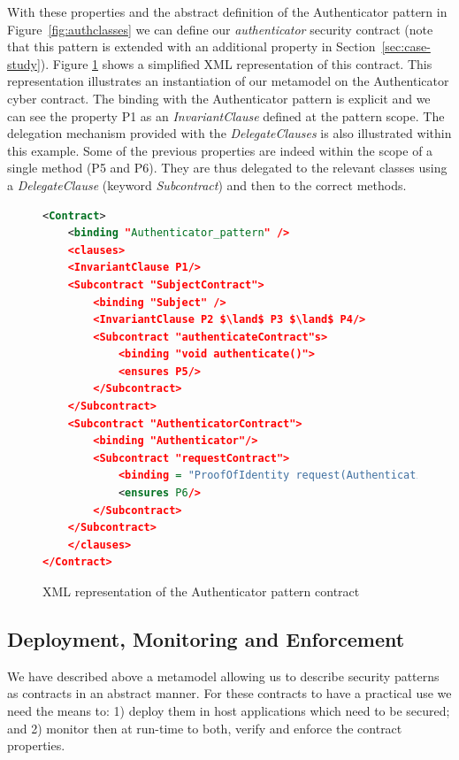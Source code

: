 With these properties and the abstract definition of the Authenticator pattern in Figure~\ref{fig:authclasses} we can define our \emph{authenticator} security contract (note that this pattern is extended with an additional property in Section~\ref{sec:case-study}). Figure \ref{fig:cybercontractXML} shows a simplified XML representation of this contract. This representation illustrates an instantiation of our metamodel on the Authenticator cyber contract. The binding with the Authenticator pattern is explicit and we can see the property P1 as an \textit{InvariantClause} defined at the pattern scope. The delegation mechanism provided with the \textit{DelegateClauses} is also illustrated within this example. Some of the previous properties are indeed within the scope of a single method (P5 and P6). They are thus delegated to the relevant classes using a \textit{DelegateClause} (keyword \textit{Subcontract}) and then to the correct methods.

\begin{figure}
    \centering
 \begin{lstlisting}[breaklines=true, language=XML, basicstyle=\ttfamily\footnotesize, mathescape=true]
<Contract>
    <binding "Authenticator_pattern" />  
    <clauses> 
    <InvariantClause P1/>  
    <Subcontract "SubjectContract">
        <binding "Subject" />
        <InvariantClause P2 $\land$ P3 $\land$ P4/>
        <Subcontract "authenticateContract"s>
            <binding "void authenticate()">
            <ensures P5/>
        </Subcontract>
    </Subcontract>
    <Subcontract "AuthenticatorContract">
        <binding "Authenticator"/>
        <Subcontract "requestContract">
            <binding = "ProofOfIdentity request(AuthenticationInformation authInfo)">
            <ensures P6/>
        </Subcontract>
    </Subcontract>
    </clauses>
</Contract>

\end{lstlisting}
\caption{XML representation of the Authenticator pattern contract}
\label{fig:cybercontractXML}
\end{figure}


\subsection{Deployment, Monitoring and Enforcement}

We have described above a metamodel allowing us to describe security patterns as contracts in an abstract manner. For these contracts to have a practical use we need the means to: 1) deploy them in host applications which need to be secured; and 2) monitor then at run-time to both, verify and enforce the contract properties. 

